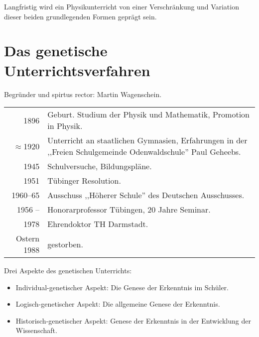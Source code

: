Langfristig wird ein Physikunterricht von einer
Verschr\"{a}nkung und Variation dieser beiden grundlegenden
Formen gepr\"{a}gt sein.

\bip\bip
\section{Das genetische Unterrichtsverfahren}

Begr\"{u}nder und spirtus rector: Martin Wagenschein.
\bip
\begin{tabular}{r p{12cm}}
1896 &  Geburt. Studium der Physik und Mathematik,
Promotion in Physik.
\\
$\approx$1920 &  Unterricht an staatlichen Gymnasien,
Erfahrungen in der ,,Freien Schulgemeinde Odenwaldschule''
Paul Geheebs.
\\
1945 &  Schulversuche, Bildungspl\"{a}ne.
\\
1951 &  T\"{u}binger Resolution.
\\
1960--65 &  Ausschuss ,,H\"{o}herer Schule'' des Deutschen Ausschusses.
\\
1956 -- &  Honorarprofessor T\"{u}bingen, 20 Jahre Seminar.
\\
1978 &  Ehrendoktor TH Darmstadt.
\\
Ostern 1988 &  gestorben.
\end{tabular}

\bip
Drei Aspekte des genetischen Unterrichts:
\begin{itemize}
\item Individual-genetischer Aspekt: Die Genese der Erkenntnis im
Sch\"{u}ler.
\item Logisch-genetischer Aspekt: Die allgemeine Genese der
Erkenntnis.
\item Historisch-genetischer Aspekt: Genese der Erkenntnis in der
Entwicklung der Wissenschaft.
\end{itemize}

